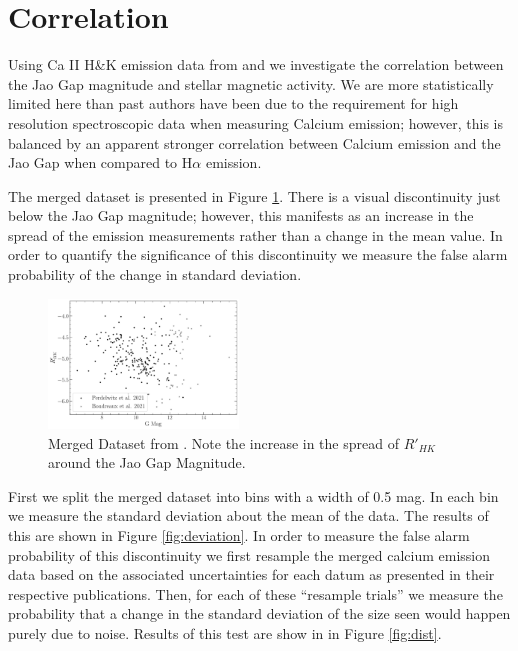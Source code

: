 \section{Correlation}\label{sec:results}
Using Ca II H\&K emission data from \citet{Boudreaux2022} and
\citet{Perdelwitz2021} \citep[quantified using the $R'_{HK}$
metric][]{Middelkoop1982, Rutten1984} we investigate the correlation between
the Jao Gap magnitude and stellar magnetic activity. We are more statistically
limited here than past authors have been due to the requirement for high
resolution spectroscopic data when measuring Calcium emission; however, this is
balanced by an apparent stronger correlation between Calcium emission and the
Jao Gap when compared to H$\alpha$ emission. 

The merged dataset is presented in Figure \ref{fig:mergedData}. There is a
visual discontinuity just below the Jao Gap magnitude; however, this
manifests as an increase in the spread of the emission measurements rather than
a change in the mean value. In order to quantify the significance of this
discontinuity we measure the false alarm probability of the change in standard
deviation.

\begin{figure}
  \centering
  \includegraphics[width=0.45\textwidth]{figures/Combined.pdf}
  \caption{Merged Dataset from \citet{Perdelwitz2021, Boudreaux2022}. Note the
  increase in the spread of $R'_{HK}$ around the Jao Gap Magnitude.}
  \label{fig:mergedData}
\end{figure}

First we split the merged dataset into bins with a width of 0.5 mag. In each bin we
measure the standard deviation about the mean of the data. The results of this
are shown in Figure \ref{fig:deviation}. In order to measure the false alarm
probability of this discontinuity we first resample the merged calcium
emission data based on the associated uncertainties for each datum as
presented in their respective publications. Then, for each of these ``resample
trials'' we measure the probability that a change in the standard deviation of
the size seen would happen purely due to noise. Results of this test are show in
in Figure \ref{fig:dist}. 

